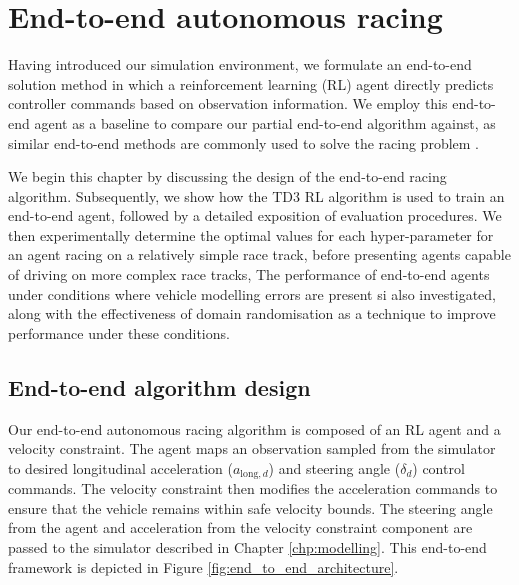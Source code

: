 \chapter{End-to-end autonomous racing}\label{chp:end_to_end_autonomous_racing}

Having introduced our simulation environment, 
we formulate an end-to-end solution method in which a reinforcement learning (RL) agent directly predicts controller commands based on observation information. 
We employ this end-to-end agent as a baseline to compare our partial end-to-end algorithm against, 
as similar end-to-end methods are commonly used to solve the racing problem \cite{Song2021, Fuchs2021, Ivanov2020, Perot2017, Jaritz2018, Schwarting2021, Niu2020, hsu2022, Chisari2021, brunnbauer2021, Remonda2021}. 

We begin this chapter by discussing the design of the end-to-end racing algorithm.
Subsequently, we show how the TD3 RL algorithm is used to train an end-to-end agent, followed by a detailed exposition of evaluation procedures. 
We then experimentally determine the optimal values for each hyper-parameter for an agent racing on a relatively simple race track, before presenting agents
capable of driving on more complex race tracks,
The performance of end-to-end agents under conditions where vehicle modelling errors are present si also investigated, along with the effectiveness of
domain randomisation as a technique to improve performance under these conditions.






\section{End-to-end algorithm design}\label{sec:end-to-end_design}

Our end-to-end autonomous racing algorithm is composed of an RL agent and a velocity constraint.
The agent maps an observation sampled from the simulator to desired longitudinal acceleration ($a_{\text{long},d}$) and steering angle ($\delta_d$) control commands.
The velocity constraint then modifies the acceleration commands to ensure that the vehicle remains within safe velocity bounds.
The steering angle from the agent and acceleration from the velocity constraint component are passed to the simulator described in Chapter \ref{chp:modelling}.
This end-to-end framework is depicted in Figure \ref{fig:end_to_end_architecture}. 

